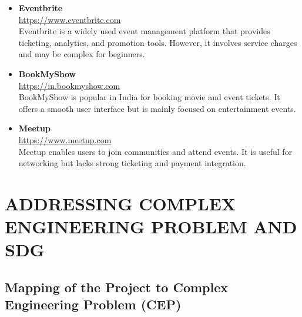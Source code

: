 \documentclass[12pt]{report}
\begin{document}
\begin{itemize}

\item \textbf{Eventbrite} \\
\url{https://www.eventbrite.com} \\
Eventbrite is a widely used event management platform that provides ticketing, analytics, and promotion tools. However, it involves service charges and may be complex for beginners.

\item \textbf{BookMyShow} \\
\url{https://in.bookmyshow.com} \\
BookMyShow is popular in India for booking movie and event tickets. It offers a smooth user interface but is mainly focused on entertainment events.

\item \textbf{Meetup} \\
\url{https://www.meetup.com} \\
Meetup enables users to join communities and attend events. It is useful for networking but lacks strong ticketing and payment integration.

\end{itemize}

\newpage
\chapter{ADDRESSING COMPLEX ENGINEERING PROBLEM AND SDG}

\section{Mapping of the Project to Complex Engineering Problem (CEP)}
\end{document}
